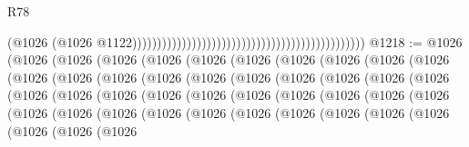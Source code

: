 \begin{lexlean}{R78}
\begin{coremodule}
                                                                                              (@1026
                                                                                                (@1026
                                                                                                  @1122)))))))))))))))))))))))))))))))))))))))))))))))
@1218 := @1026
    (@1026
      (@1026
        (@1026
          (@1026
            (@1026
              (@1026
                (@1026
                  (@1026
                    (@1026
                      (@1026
                        (@1026
                          (@1026
                            (@1026
                              (@1026
                                (@1026
                                  (@1026
                                    (@1026
                                      (@1026
                                        (@1026
                                          (@1026
                                            (@1026
                                              (@1026
                                                (@1026
                                                  (@1026
                                                    (@1026
                                                      (@1026
                                                        (@1026
                                                          (@1026
                                                            (@1026
                                                              (@1026
                                                                (@1026
                                                                  (@1026
                                                                    (@1026
                                                                      (@1026
                                                                        (@1026
                                                                          (@1026
                                                                            (@1026
                                                                              (@1026
                                                                                (@1026
                                                                                  (@1026
                                                                                    (@1026
                                                                                      (@1026
                                                                                        (@1026

\end{coremodule}
\end{lexlean}
